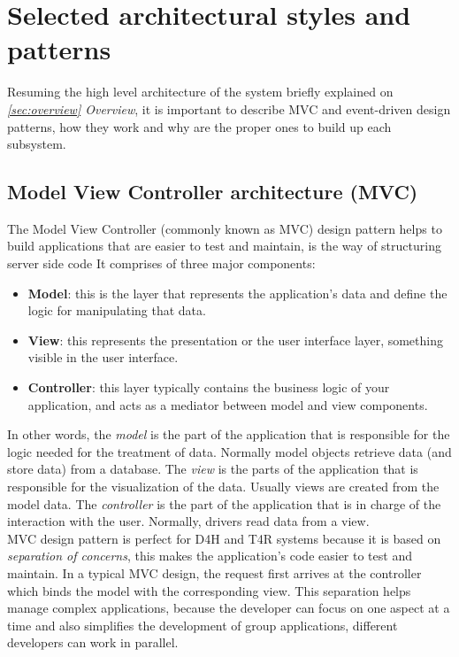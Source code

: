 \documentclass[a4paper, hidelinks, 12pt]{report}
\begin{document}
	\section{Selected architectural styles and patterns}
Resuming the high level architecture of the system briefly explained on \textit{ \autoref{sec:overview} Overview}, it is important to describe MVC	and event-driven design patterns, how they work and why are the proper ones to build up each subsystem.

	\subsection{Model View Controller architecture (MVC)}
	The Model View Controller (commonly known as MVC) design pattern helps  to build applications that are easier to test and maintain, is the way of structuring server side code 
	It comprises of three major components:
	
	\begin{itemize}
	\item {\textbf{Model}}: this is the layer that represents the application's data and define the logic for manipulating that data.
	\item {\textbf{View}}: this represents the presentation or the user interface layer, something visible in the user interface.
	\item{\textbf{Controller}}: this layer typically contains the business logic of your application, and acts as a mediator between model and view components.
	\end{itemize}

	In other words, the \textit{model} is the part of the application that is responsible for the logic needed for the treatment of data. Normally model objects retrieve data (and store data) from a database. The \textit{view} is the parts of the application that is responsible for the visualization of the data. Usually views are created from the model data. The \textit{controller} is the part of the application that is in charge of the interaction with the user. Normally, drivers read data from a view. \\
	
	MVC design pattern is perfect for D4H and T4R systems because it is based on \textit{separation of concerns}, this makes the application's code easier to test and maintain. In a typical MVC design, the request first arrives at the controller which binds the model with the corresponding view. This separation helps manage complex applications, because the developer can focus on one aspect at a time and also simplifies the development of group applications, different developers can work in parallel. 
 
\end{document}
